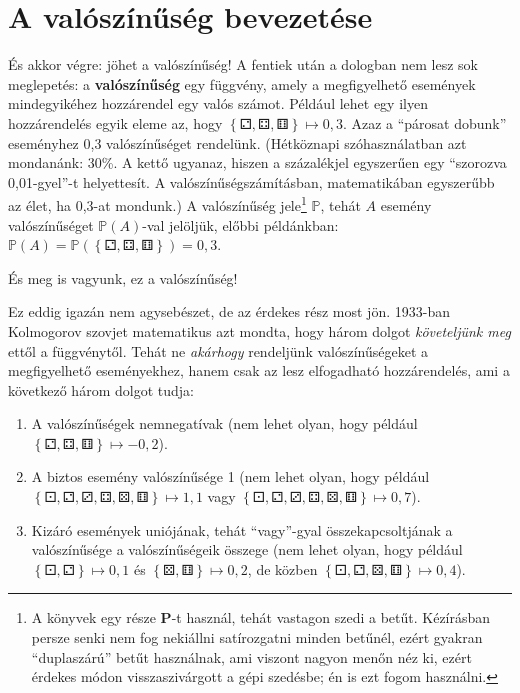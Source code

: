 \documentclass[magyar,]{book}
\providecommand{\tightlist}{%
  \setlength{\itemsep}{0pt}\setlength{\parskip}{0pt}}
\let\rmarkdownfootnote\footnote%
\def\footnote{\protect\rmarkdownfootnote}
\begin{document}
\hypertarget{a-valuxf3szuxednux171suxe9g-bevezetuxe9se}{%
\section{A valószínűség bevezetése}\label{a-valuxf3szuxednux171suxe9g-bevezetuxe9se}}

És akkor végre: jöhet a valószínűség! A fentiek után a dologban nem lesz sok meglepetés: a \textbf{valószínűség} egy függvény, amely a megfigyelhető események mindegyikéhez hozzárendel egy valós számot. Például lehet egy ilyen hozzárendelés egyik eleme az, hogy \(\left\{⚁,⚃,⚅\right\}\mapsto0,\!3\). Azaz a \enquote{párosat dobunk} eseményhez 0,3 valószínűséget rendelünk. (Hétköznapi szóhasználatban azt mondanánk: 30\%. A kettő ugyanaz, hiszen a százalékjel egyszerűen egy \enquote{szorozva 0,01-gyel}-t helyettesít. A valószínűségszámításban, matematikában egyszerűbb az élet, ha 0,3-at mondunk.) A valószínűség jele\footnote{A könyvek egy része \(\mathbf{P}\)-t használ, tehát vastagon szedi a betűt. Kézírásban persze senki nem fog nekiállni satírozgatni minden betűnél, ezért gyakran \enquote{duplaszárú} betűt használnak, ami viszont nagyon menőn néz ki, ezért érdekes módon visszaszivárgott a gépi szedésbe; én is ezt fogom használni.} \(\mathbb{P}\), tehát \(A\) esemény valószínűséget \(\mathbb{P}\left(A\right)\)-val jelöljük, előbbi példánkban: \(\mathbb{P}\left(A\right)=\mathbb{P}\left(\left\{⚁,⚃,⚅\right\}\right)=0,\!3\).

És meg is vagyunk, ez a valószínűség!

Ez eddig igazán nem agysebészet, de az érdekes rész most jön. 1933-ban Kolmogorov szovjet matematikus azt mondta, hogy három dolgot \emph{követeljünk meg} ettől a függvénytől. Tehát ne \emph{akárhogy} rendeljünk valószínűségeket a megfigyelhető eseményekhez, hanem csak az lesz elfogadható hozzárendelés, ami a következő három dolgot tudja:

\begin{enumerate}
\def\labelenumi{\arabic{enumi}.}
\tightlist
\item
  A valószínűségek nemnegatívak (nem lehet olyan, hogy például \(\left\{⚁,⚃,⚅\right\}\mapsto- 0,\!2\)).
\item
  A biztos esemény valószínűsége 1 (nem lehet olyan, hogy például \(\left\{⚀,⚁,⚂,⚃,⚄,⚅\right\}\mapsto 1,\!1\) vagy \(\left\{⚀,⚁,⚂,⚃, ⚄ ,⚅ \right\}\mapsto 0,\!7\)).
\item
  Kizáró események uniójának, tehát \enquote{vagy}-gyal összekapcsoltjának a valószínűsége a valószínűségeik összege (nem lehet olyan, hogy például \(\left\{⚀,⚁\right\}\mapsto 0,\!1\) és \(\left\{⚄,⚅\right\}\mapsto 0,\!2\), de közben \(\left\{⚀,⚁,⚄,⚅\right\}\mapsto 0,\!4\)).
\end{enumerate}
\end{document}
